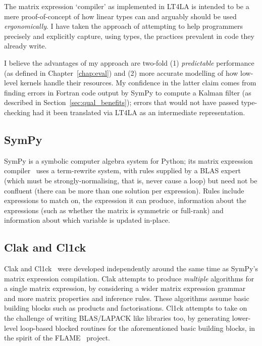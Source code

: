 The matrix expression `compiler' as implemented in LT4LA is intended to be a
mere proof-of-concept of how linear types can and arguably should be used
\emph{ergonomically}. I have taken the approach of attempting to help
programmers precisely and explicitly capture, using types, the practices
prevalent in code they already write.

I believe the advantages of my approach are two-fold (1) \emph{predictable}
performance (as defined in Chapter~\ref{chap:eval}) and (2) more accurate
modelling of how low-level kernels handle their resources. My confidence in the
latter claim comes from finding errors in Fortran code output by SymPy to
compute a Kalman filter (as described in Section~\ref{sec:qual_benefits});
errors that would not have passed type-checking had it been translated via
LT4LA as an intermediate representation.

\subsection{SymPy}

SymPy is a symbolic computer algebra system for Python; its matrix expression
compiler~\cite{rocklin_thesis} uses a term-rewrite system, with rules supplied
by a BLAS expert (which must be strongly-normalising, that is, never cause a
loop) but need not be confluent (there can be more than one solution per
expression). Rules include expressions to match on, the expression it can
produce, information about the expressions (such as whether the matrix is
symmetric or full-rank) and information about which variable is updated
in-place.

\subsection{Clak and Cl1ck}

Clak and Cl1ck~\cite{fabregat_thesis} were developed independently around the
same time as SymPy's matrix expression compilation. Clak attempts to produce
\emph{multiple} algorithms for a single matrix expression, by considering a
wider matrix expression grammar and more matrix properties and inference rules.
These algorithms assume basic building blocks such as products and
factorisations. Cl1ck attempts to take on the challenge of writing BLAS/LAPACK
like libraries too, by generating lower-level loop-based blocked routines for
the aforementioned basic building blocks, in the spirit of the
FLAME~\cite{gunnels_flame} project.

